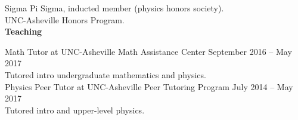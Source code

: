 \documentclass[letterpaper, 11pt]{article}
\newcommand{\noi}{\noindent}
\begin{document}
\noi Sigma Pi Sigma, inducted member (physics honors society).
\\

\noi UNC-Asheville Honors Program.
\\

\noi \textbf{Teaching}

\noi Math Tutor at UNC-Asheville Math Assistance Center \hfill September 2016 -- May 2017
\\
Tutored intro undergraduate mathematics and physics.
\\

\noi Physics Peer Tutor at UNC-Asheville Peer Tutoring Program \hfill July 2014 -- May 2017
\\
Tutored intro and upper-level physics.
\\
\end{document}
